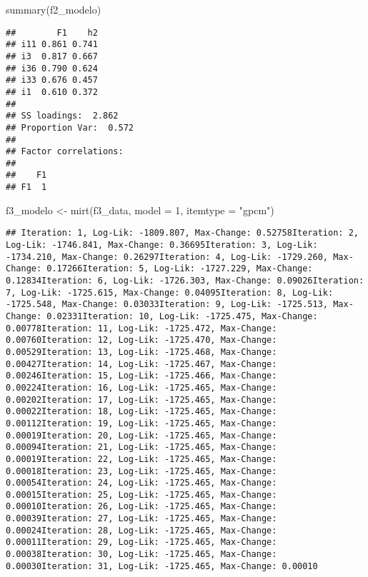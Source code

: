 \documentclass[
]{article}
\newenvironment{Shaded}{\begin{snugshade}}{\end{snugshade}}
\newcommand{\AttributeTok}[1]{\textcolor[rgb]{0.77,0.63,0.00}{#1}}
\newcommand{\DecValTok}[1]{\textcolor[rgb]{0.00,0.00,0.81}{#1}}
\newcommand{\FunctionTok}[1]{\textcolor[rgb]{0.00,0.00,0.00}{#1}}
\newcommand{\NormalTok}[1]{#1}
\newcommand{\OtherTok}[1]{\textcolor[rgb]{0.56,0.35,0.01}{#1}}
\newcommand{\StringTok}[1]{\textcolor[rgb]{0.31,0.60,0.02}{#1}}
\begin{document}
\begin{Shaded}
\begin{Highlighting}[]
\FunctionTok{summary}\NormalTok{(f2\_modelo)}
\end{Highlighting}
\end{Shaded}

\begin{verbatim}
##        F1    h2
## i11 0.861 0.741
## i3  0.817 0.667
## i36 0.790 0.624
## i33 0.676 0.457
## i1  0.610 0.372
## 
## SS loadings:  2.862 
## Proportion Var:  0.572 
## 
## Factor correlations: 
## 
##    F1
## F1  1
\end{verbatim}

\begin{Shaded}
\begin{Highlighting}[]
\NormalTok{f3\_modelo }\OtherTok{\textless{}{-}} \FunctionTok{mirt}\NormalTok{(f3\_data, }\AttributeTok{model =} \DecValTok{1}\NormalTok{, }\AttributeTok{itemtype =} \StringTok{"gpcm"}\NormalTok{)}
\end{Highlighting}
\end{Shaded}

\begin{verbatim}
## Iteration: 1, Log-Lik: -1809.807, Max-Change: 0.52758Iteration: 2, Log-Lik: -1746.841, Max-Change: 0.36695Iteration: 3, Log-Lik: -1734.210, Max-Change: 0.26297Iteration: 4, Log-Lik: -1729.260, Max-Change: 0.17266Iteration: 5, Log-Lik: -1727.229, Max-Change: 0.12834Iteration: 6, Log-Lik: -1726.303, Max-Change: 0.09026Iteration: 7, Log-Lik: -1725.615, Max-Change: 0.04095Iteration: 8, Log-Lik: -1725.548, Max-Change: 0.03033Iteration: 9, Log-Lik: -1725.513, Max-Change: 0.02331Iteration: 10, Log-Lik: -1725.475, Max-Change: 0.00778Iteration: 11, Log-Lik: -1725.472, Max-Change: 0.00760Iteration: 12, Log-Lik: -1725.470, Max-Change: 0.00529Iteration: 13, Log-Lik: -1725.468, Max-Change: 0.00427Iteration: 14, Log-Lik: -1725.467, Max-Change: 0.00246Iteration: 15, Log-Lik: -1725.466, Max-Change: 0.00224Iteration: 16, Log-Lik: -1725.465, Max-Change: 0.00202Iteration: 17, Log-Lik: -1725.465, Max-Change: 0.00022Iteration: 18, Log-Lik: -1725.465, Max-Change: 0.00112Iteration: 19, Log-Lik: -1725.465, Max-Change: 0.00019Iteration: 20, Log-Lik: -1725.465, Max-Change: 0.00094Iteration: 21, Log-Lik: -1725.465, Max-Change: 0.00019Iteration: 22, Log-Lik: -1725.465, Max-Change: 0.00018Iteration: 23, Log-Lik: -1725.465, Max-Change: 0.00054Iteration: 24, Log-Lik: -1725.465, Max-Change: 0.00015Iteration: 25, Log-Lik: -1725.465, Max-Change: 0.00010Iteration: 26, Log-Lik: -1725.465, Max-Change: 0.00039Iteration: 27, Log-Lik: -1725.465, Max-Change: 0.00024Iteration: 28, Log-Lik: -1725.465, Max-Change: 0.00011Iteration: 29, Log-Lik: -1725.465, Max-Change: 0.00038Iteration: 30, Log-Lik: -1725.465, Max-Change: 0.00030Iteration: 31, Log-Lik: -1725.465, Max-Change: 0.00010
\end{verbatim}
\end{document}
